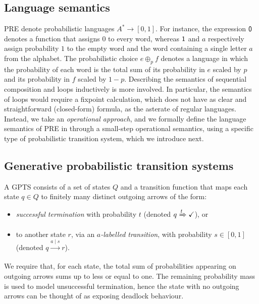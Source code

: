 \subsection{Language semantics}
{PRE} denote probabilistic languages $A^* \to [0,1]$. For instance, the expression $\mathsf{0}$ denotes a function that assigns $0$ to every word, whereas $\mathsf{1}$ and $a$ respectively assign probability $1$ to the empty word and the word containing a single letter $a$ from the alphabet. The probabilistic choice $e \oplus_p f$ denotes a language in which the probability of each word is the total sum of its probability in $e$ scaled by $p$ and its probability in $f$ scaled by $1-p$. Describing the semantics of sequential composition and loops inductively is more involved. In particular, the semantics of loops would require a fixpoint calculation, which does not have as clear and straightforward (closed-form) formula, as the asterate of regular languages. Instead, we take an \emph{operational approach}, and we formally define the language semantics of {PRE} in  through a small-step operational semantics, using a specific type of probabilistic transition system, which we introduce next.

\subsection{Generative probabilistic transition systems}
A {GPTS} consists of a set of states $Q$ and a transition function that maps each state $q\in Q$ to finitely many distinct outgoing arrows of the form:
\begin{itemize}
    \item \emph{successful termination} with probability $t$ (denoted $q \xRightarrow[]{t} \checkmark$), or 
    \item to another state $r$, via an \emph{$a$-labelled transition}, with probability $s \in [0,1] $ (denoted $q \xrightarrow[]{a \mid s} r$).
\end{itemize} 
We require that, for each state, the total sum of probabilities appearing on outgoing arrows sums up to less or equal to one. The remaining probability mass is used to model unsuccessful termination, hence the state with no outgoing arrows can be thought of as exposing deadlock behaviour. 

